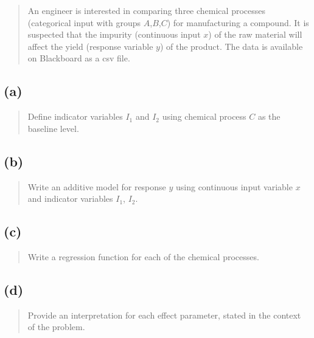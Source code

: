 \documentclass[
]{article}
\begin{document}
\begin{quote}
An engineer is interested in comparing three chemical processes
(categorical input with groups \(A\),\(B\),\(C\)) for manufacturing a
compound. It is suspected that the impurity (continuous input \(x\)) of
the raw material will affect the yield (response variable \(y\)) of the
product. The data is available on Blackboard as a csv file.
\end{quote}

\vspace{50pt}

\hypertarget{a-2}{%
\subsection{(a)}\label{a-2}}

\begin{quote}
Define indicator variables \(I_1\) and \(I_2\) using chemical process
\(C\) as the baseline level.
\end{quote}

\vspace{50pt}

\hypertarget{b-2}{%
\subsection{(b)}\label{b-2}}

\begin{quote}
Write an additive model for response \(y\) using continuous input
variable \(x\) and indicator variables \(I_1\), \(I_2\).
\end{quote}

\vspace{50pt}

\hypertarget{c-2}{%
\subsection{(c)}\label{c-2}}

\begin{quote}
Write a regression function for each of the chemical processes.
\end{quote}

\vspace{50pt}

\hypertarget{d-2}{%
\subsection{(d)}\label{d-2}}

\begin{quote}
Provide an interpretation for each effect parameter, stated in the
context of the problem.
\end{quote}
\end{document}
